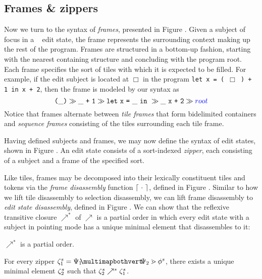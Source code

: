 



\subsection{Frames \& zippers}
Now we turn to the syntax of \emph{frames}, presented
in Figure .
Given a subject of focus in a \ty~ edit state, the frame
represents the surrounding context making up the rest of the program.
Frames are structured in a bottom-up fashion, starting
with the nearest containing structure and concluding
with the program root.
Each frame specifies the sort of tiles with which it is
expected to be filled.
For example, if the edit subject is located at $\Box$
in the program \texttt{let x = ( $\Box$ ) + 1 in x + 2},
then the frame is modeled by our syntax as
\[
  \tframelit{
    \sparen{\_}
  }{
    \tframelit{
      \_\splus{}{\texttt{1}}
    }{
      \tframelit{
        \slet{\texttt{x}}{\_}{}
      }{
        \tframelit{
          \_\ \splus{\texttt{x}}{\texttt{2}}
        }{
          \note{root}
        }
      }
    }
  }
\]
Notice that frames alternate between \emph{tile
frames} that form bidelimited containers and
\emph{sequence frames} consisting of the tiles
surrounding each tile frame.

Having defined subjects and frames, we may now
define the syntax of edit states,
shown in Figure .
An edit state consists of a sort-indexed \emph{zipper},
each consisting of a subject and a frame of the
specified sort.

Like tiles, frames may be decomposed into their
lexically constituent tiles and tokens via the
\emph{frame disassembly} function $\left\lceil~\cdot~\right\rceil$,
defined in Figure .
Similar to how we lift tile disassembly to selection
disassembly, we can lift frame disassembly to
\emph{edit state disassembly}, defined in Figure .
We can show that the reflexive transitive closure
$\nearrow^*$ of $\nearrow$ is a partial order in
which every edit state with a subject in pointing mode
has a unique minimal element that disassembles to it:
\begin{lemma}
  $\nearrow^*$ is a partial order.
\end{lemma}
\begin{lemma}\label{lemma:unique-parsed-editstate}
  For every zipper $\zip^s_1 = \zipper{\pointing{\selection_1}{\selection_2}}{\tfrelem^s}$, there exists
  a unique minimal element $\zeta^s_2$ such that $\zeta^s_2 \nearrow^* \zeta^s_1$.
\end{lemma}


